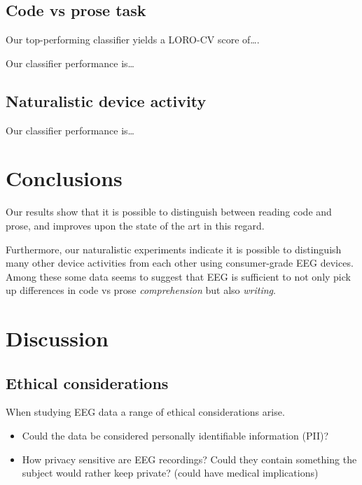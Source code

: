 \documentclass[a4paper]{article}
\begin{document}
\begin{refsection}
    \subsection{Code vs prose task}

        Our top-performing classifier yields a LORO-CV score of\ldots.

        Our classifier performance is\ldots

    \subsection{Naturalistic device activity}

        Our classifier performance is\ldots

\section{Conclusions}

    Our results show that it is possible to distinguish between reading code and prose, and improves upon the state of the art in this regard.

    Furthermore, our naturalistic experiments indicate it is possible to distinguish many other device activities from each other using consumer-grade EEG devices. Among these some data seems to suggest that EEG is sufficient to not only pick up differences in code vs prose \emph{comprehension} but also \emph{writing}.

\section{Discussion}

    \subsection{Ethical considerations}

        When studying EEG data a range of ethical considerations arise. 

        \begin{itemize}
            \item Could the data be considered personally identifiable information (PII)? 
            \item How privacy sensitive are EEG recordings? Could they contain something the subject would rather keep private? (could have medical implications)
        \end{itemize}


\end{refsection}
\end{document}
